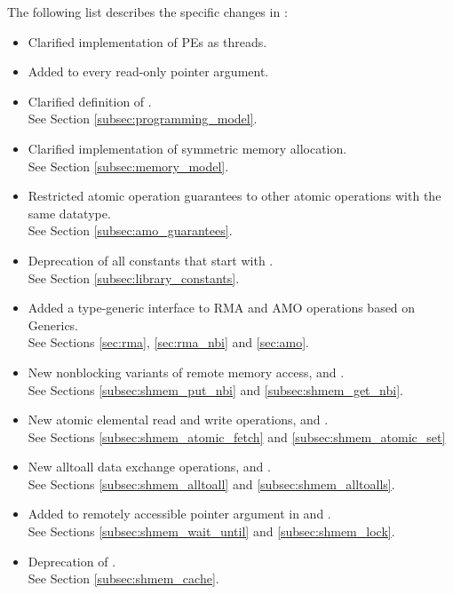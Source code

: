 The following list describes the specific changes in \openshmem[1.3]:
\begin{itemize}
%
\item Clarified implementation of \acp{PE} as threads.
%
\item Added  to every read-only pointer argument.
%
\item Clarified definition of .
\\See Section \ref{subsec:programming_model}.
%
\item Clarified implementation of symmetric memory allocation.
\\See Section \ref{subsec:memory_model}.
%
\item Restricted atomic operation guarantees to other atomic operations with the same datatype.
\\See Section \ref{subsec:amo_guarantees}.
%
\item Deprecation of all constants that start with .
\\See Section \ref{subsec:library_constants}.
%
\item Added a type-generic interface to \openshmem \ac{RMA} and \ac{AMO}
	operations based on \Cstd[11] Generics.
\\See Sections \ref{sec:rma}, \ref{sec:rma_nbi} and \ref{sec:amo}.
%
\item New nonblocking variants of remote memory access, 
	and .
\\See Sections \ref{subsec:shmem_put_nbi} and \ref{subsec:shmem_get_nbi}.
%
\item New atomic elemental read and write operations,  and
	.
\\See Sections \ref{subsec:shmem_atomic_fetch} and \ref{subsec:shmem_atomic_set}
%
\item New alltoall data exchange operations,  
	and .
\\See Sections \ref{subsec:shmem_alltoall} and \ref{subsec:shmem_alltoalls}.
%
\item Added  to remotely accessible pointer argument in
	 and .
\\See Sections \ref{subsec:shmem_wait_until} and \ref{subsec:shmem_lock}.
%
\item Deprecation of .
\\See Section \ref{subsec:shmem_cache}.
%
\end{itemize}





